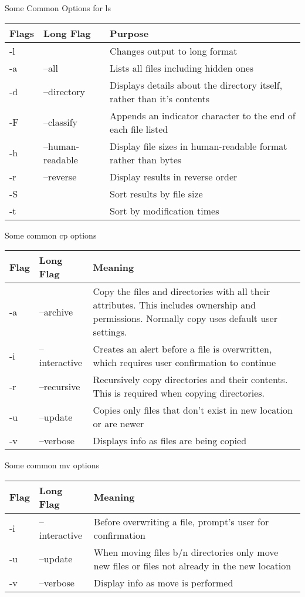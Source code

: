 \documentclass[12pt]{article}
\begin{document}
\vskip 0.15in
Some Common Options for ls\newline
\noindent\begin{tabular}{| l | l | p{4in} |}
	\hline
	Flags & Long Flag &Purpose\\ \hline
	-l & & Changes output to long format\\
	-a & --all & Lists all files including hidden ones\\
	-d & --directory & Displays details about the directory itself, rather than it's contents\\
	-F & --classify & Appends an indicator character to the end of each file listed\\
	-h & --human-readable & Display file sizes in human-readable format rather than bytes\\
	-r & --reverse & Display results in reverse order\\
	-S & & Sort results by file size\\
	-t & & Sort by modification times\\
	\hline
	

\end{tabular}

\vskip 0.15in
Some common cp options\newline
\noindent\begin{tabular}{|l|l|p{4in}|}
	\hline
	Flag & Long Flag & Meaning\\ \hline
	-a & --archive & Copy the files and directories with all their attributes. This includes ownership and permissions. Normally copy uses default user settings.\\
	-i & --interactive & Creates an alert before a file is overwritten, which requires user confirmation to continue\\
	-r & --recursive & Recursively copy directories and their contents. This is required when copying directories.\\
	-u & --update & Copies only files that don't exist in new location or are newer\\
	-v & --verbose & Displays info as files are being copied\\ \hline

\end{tabular}

\vskip 0.15in
Some common mv options\newline
\noindent\begin{tabular}{|l|l|p{4in}|}
	\hline
	Flag & Long Flag & Meaning\\ \hline
	-i & --interactive & Before overwriting a file, prompt's user for confirmation\\
	-u & --update & When moving files b/n directories only move new files or files not already in the new location\\
	-v & --verbose & Display info as move is performed\\ \hline	
\end{tabular}
\end{document}
